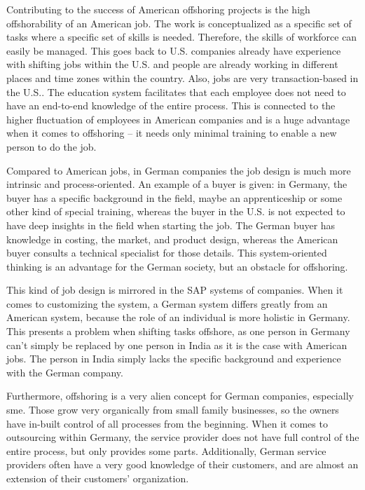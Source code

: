 Contributing to the success of American offshoring projects is the high offshorability of an American job. The work is conceptualized as a specific set of tasks where a specific set of skills is needed. Therefore, the skills of workforce can easily be managed. This goes back to U.S. companies already have experience with shifting jobs within the U.S. and people are already working in different places and time zones within the country. Also, jobs are very transaction-based in the U.S.. The education system facilitates that each employee does not need to have an end-to-end knowledge of the entire process. This is connected to the higher fluctuation of employees in American companies and is a huge advantage when it comes to offshoring -- it needs only minimal training to enable a new person to do the job.

Compared to American jobs, in German companies the job design is much more intrinsic and process-oriented. An example of a buyer is given: in Germany, the buyer has a specific background in the field, maybe an apprenticeship or some other kind of special training, whereas the buyer in the U.S. is not expected to have deep insights in the field when starting the job. The German buyer has knowledge in costing, the market, and product design, whereas the American buyer consults a technical specialist for those details. This system-oriented thinking is an advantage for the German society, but an obstacle for offshoring.

This kind of job design is mirrored in the SAP systems of companies. When it comes to customizing the system, a German system differs greatly from an American system, because the role of an individual is more holistic in Germany. This presents a problem when shifting tasks offshore, as one person in Germany can't simply be replaced by one person in India as it is the case with American jobs. The person in India simply lacks the specific background and experience with the German company.

Furthermore, offshoring is a very alien concept for German companies, especially \gls{sme}. Those grow very organically from small family businesses, so the owners have in-built control of all processes from the beginning. When it comes to outsourcing within Germany, the service provider does not have full control of the entire process, but only provides some parts. Additionally, German service providers often have a very good knowledge of their customers, and are almost an extension of their customers' organization. 

